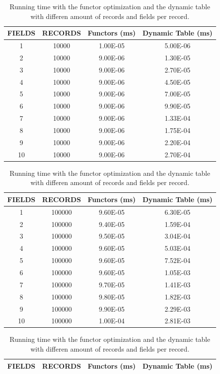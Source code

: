 \begin{table}	
	\caption{Running time with the functor optimization and the dynamic table with differen amount of records and fields per record.}
	\begin{tabular}{|c|c|c|c|}
		\hline
		\textbf{FIELDS}& \textbf{RECORDS}& \textbf{Functors (ms)}&\textbf{Dynamic Table (ms)}\\ \hline
		1&	10000&	1.00E-05&	5.00E-06\\ \hline
		2&	10000&	9.00E-06&	1.30E-05\\ \hline
		3&	10000&	9.00E-06&	2.70E-05\\ \hline
		4&	10000&	9.00E-06&	4.50E-05\\ \hline
		5&	10000&	9.00E-06&	7.00E-05\\ \hline
		6&	10000&	9.00E-06&	9.90E-05\\ \hline
		7&	10000&	9.00E-06&	1.33E-04\\ \hline
		8&	10000&	9.00E-06&	1.75E-04\\ \hline
		9&	10000&	9.00E-06&	2.20E-04\\ \hline
		10&	10000&	9.00E-06&	2.70E-04\\ \hline			
	\end{tabular}
	\vspace{0.15cm}
	\begin{tabular}{|c|c|c|c|}
		\hline
		\textbf{FIELDS}& \textbf{RECORDS}& \textbf{Functors (ms)}&\textbf{Dynamic Table (ms)}\\ \hline
		1&	100000&	9.60E-05&	6.30E-05\\ \hline
		2&	100000&	9.40E-05&	1.59E-04\\ \hline
		3&	100000&	9.50E-05&	3.04E-04\\ \hline
		4&	100000&	9.60E-05&	5.03E-04\\ \hline
		5&	100000&	9.60E-05&	7.52E-04\\ \hline
		6&	100000&	9.60E-05&	1.05E-03\\ \hline
		7&	100000&	9.70E-05&	1.41E-03\\ \hline
		8&	100000&	9.80E-05&	1.82E-03\\ \hline
		9&	100000&	9.90E-05&	2.29E-03\\ \hline
		10&	100000&	1.00E-04&	2.81E-03\\ \hline				
	\end{tabular}
	\vspace{0.15cm}
	\begin{tabular}{|c|c|c|c|}
		\hline
		\textbf{FIELDS}& \textbf{RECORDS}& \textbf{Functors (ms)}&\textbf{Dynamic Table (ms)}\\ \hline

\end{tabular}
\end{table}
